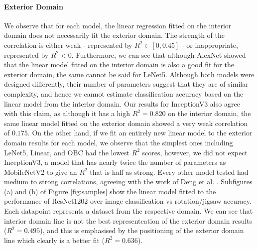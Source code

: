 \documentclass{article}
\begin{document}
\paragraph{Exterior Domain} We observe that for each model, the linear regression fitted on the interior domain does not necessarily fit the exterior domain. The strength of the correlation is either weak - represented by $R^2 \in [0, 0.45]$ - or inappropriate, represented by $R^2 < 0$. Furthermore, we can see that although AlexNet showed that the linear model fitted on the interior domain is also a good fit for the exterior domain, the same cannot be said for LeNet5. Although both models were designed differently, their number of parameters suggest that they are of similar complexity, and hence we cannot estimate classification accuracy based on the linear model from the interior domain. Our results for InceptionV3 also agree with this claim, as although it has a high $R^2 = 0.820$ on the interior domain, the same linear model fitted on the exterior domain showed a very weak correlation of $0.175$. On the other hand, if we fit an entirely new linear model to the exterior domain results for each model, we observe that the simplest ones including LeNet5, Linear, and OBC had the lowest $R^2$ scores, however, we did not expect InceptionV3, a model that has nearly twice the number of parameters as MobileNetV2 to give an $R^2$ that is half as strong. Every other model tested had medium to strong correlations, agreeing with the work of Deng et al. \cite{Deng:ICML2021}. Subfigures (a) and (b) of Figure \ref{fig:samples} show the linear model fitted to the performance of ResNet1202 over image classification vs rotation/jigsaw accuracy. Each datapoint represents a dataset from the respective domain. We can see that interior domain line is not the best representeation of the exterior domain results ($R^2 = 0.495$), and this is emphasised by the positioning of the exterior domain line which clearly is a better fit ($R^2 = 0.636$).
\end{document}
